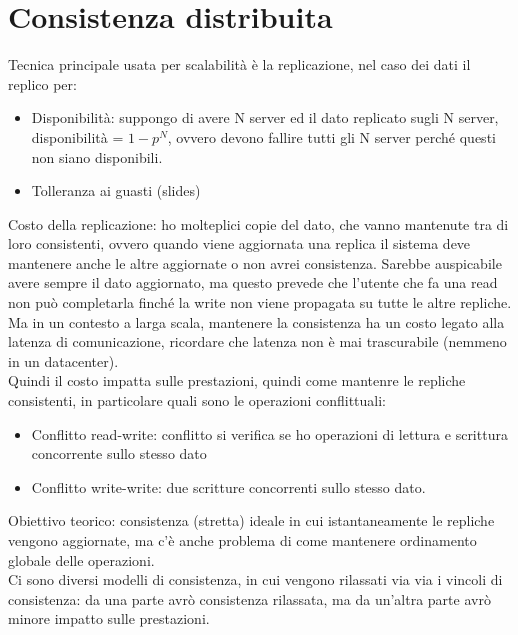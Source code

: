 \documentclass{article}
\begin{document}
\section{Consistenza distribuita}
Tecnica principale usata per scalabilità è la replicazione, nel caso dei dati il replico per:
\begin{itemize} 
\item Disponibilità: suppongo di avere N server ed il dato replicato sugli N server, disponibilità = $1-p^N$, ovvero devono fallire tutti gli N server perché questi non siano disponibili.
\item Tolleranza ai guasti (slides)
\end{itemize}
Costo della replicazione: ho molteplici copie del dato, che vanno mantenute tra di loro consistenti, ovvero quando viene aggiornata una replica il sistema deve mantenere anche le altre aggiornate o non avrei consistenza. Sarebbe auspicabile avere sempre il dato aggiornato, ma questo prevede che l'utente che fa una read non può completarla finché la write non viene propagata su tutte le altre repliche. Ma in un contesto a larga scala, mantenere la consistenza ha un costo legato alla latenza di comunicazione, ricordare che latenza non è mai trascurabile (nemmeno in un datacenter).\\ Quindi il costo impatta sulle prestazioni, quindi come mantenre le repliche consistenti, in particolare quali sono le operazioni conflittuali:
\begin{itemize}
\item Conflitto read-write: conflitto si verifica se ho operazioni di lettura e scrittura concorrente sullo stesso dato
\item Conflitto write-write: due scritture concorrenti sullo stesso dato.
\end{itemize}
Obiettivo teorico: consistenza (stretta) ideale in cui istantaneamente le repliche vengono aggiornate, ma c'è anche problema di come mantenere ordinamento globale delle operazioni.\\ Ci sono diversi modelli di consistenza, in cui vengono rilassati via via i vincoli di consistenza: da una parte avrò consistenza rilassata, ma da un'altra parte avrò minore impatto sulle prestazioni.
\end{document}
